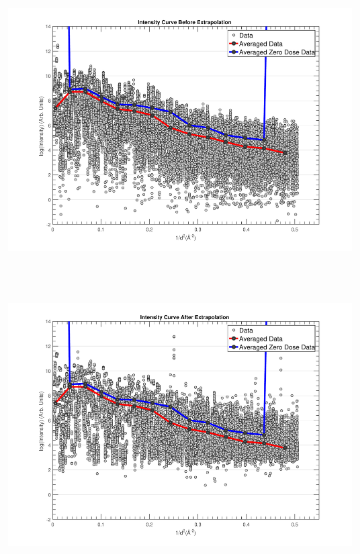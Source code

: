 \begin{figure}
	\centering
	\begin{subfigure}[b]{0.94\textwidth}
		\centering
		\includegraphics[width=\textwidth]{figures/zde/IntensityCurve_BeforeExtrapolation.pdf}
		\caption{}
		\label{fig:Before extrapolation all observations - Extrapolation method}
	\end{subfigure}
	\\
	\begin{subfigure}[b]{0.94\textwidth}
		\centering
		\includegraphics[width=\textwidth]{figures/zde/IntensityCurve_AfterExtrapolation.pdf}
		\caption{}
		\label{fig:After extrapolation all observations - Extrapolation method}
	\end{subfigure}
	\caption{}
	\label{fig:Before and after extrapolation results - Extrapolation method}
\end{figure}
